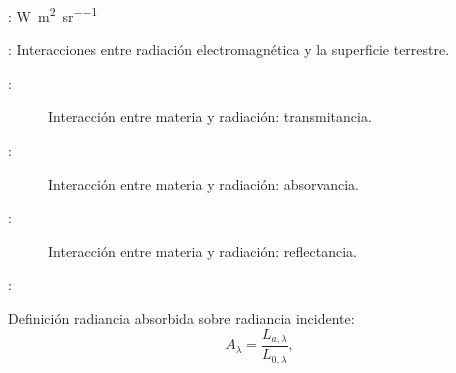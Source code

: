 \begin{frame}{\secname : \subsecname}
\si{\watt\per\square\meter\per\steradian}
\end{frame}


\begin{frame}{\secname : \subsecname}
 Interacciones entre radiación electromagnética y la superficie terrestre.
\end{frame}



\begin{frame}{\secname : \subsecname}
  \begin{figure}
    \centering
    \caption{Interacción entre materia y radiación: transmitancia.}
    \label{}
  \end{figure}
\end{frame}



\begin{frame}{\secname : \subsecname}
  \begin{figure}
    \centering
    \caption{Interacción entre materia y radiación: absorvancia.}
    \label{}
  \end{figure}
\end{frame}


\begin{frame}{\secname : \subsecname}
  \begin{figure}
    \centering
    \caption{Interacción entre materia y radiación: reflectancia.}
    \label{}
  \end{figure}
\end{frame}


\begin{frame}{\secname : \subsecname}
    \begin{block}{Definición}
      radiancia absorbida sobre radiancia incidente:
        \begin{equation}
         A_\lambda = \frac{L_{a,\lambda}}{L_{0,\lambda}} ,
        \end{equation}
         \end{block}
\end{frame}

